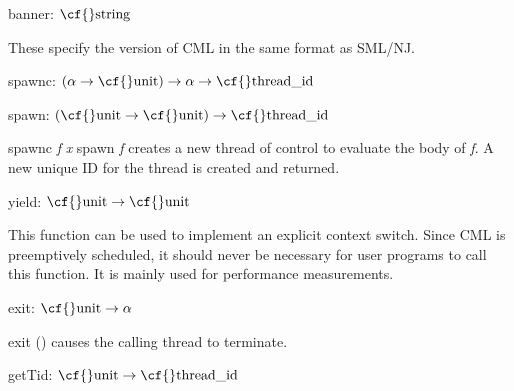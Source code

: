 \begin{descr}
\item {}{} {\cf banner: \(\mbox{\cf{}string}\)}\label{val-CML.banner}


\begin{speccomment}
\item 

	These specify the version of CML in the same format as SML/NJ.     \end{speccomment}
\item {}{} {\cf spawnc: \((\alpha\rightarrow \mbox{\cf{}unit})\rightarrow \alpha\rightarrow \mbox{\cf{}thread\_id}\)}\label{val-CML.spawnc}

\item {}{} {\cf spawn: \((\mbox{\cf{}unit}\rightarrow \mbox{\cf{}unit})\rightarrow \mbox{\cf{}thread\_id}\)}\label{val-CML.spawn}


\begin{speccomment}
\item {\cf \small spawnc \mbox{\cf \small \textit{f}} \mbox{\cf \small \textit{x}} 	\newline}
{\cf \small           spawn \mbox{\cf \small \textit{f}}         } 
creates a new thread of control to evaluate the body of \mbox{\cf \small \textit{f}}. 	A new unique ID for the thread is created and returned.     \end{speccomment}
\item {}{} {\cf yield: \(\mbox{\cf{}unit}\rightarrow \mbox{\cf{}unit}\)}\label{val-CML.yield}


\begin{speccomment}
\item 

	This function can be used to implement an explicit context switch. 	Since CML is preemptively scheduled, it should never be necessary for 	user programs to call this function. 	It is mainly used for performance measurements.     \end{speccomment}
\item {}{} {\cf exit: \(\mbox{\cf{}unit}\rightarrow \alpha\)}\label{val-CML.exit}


\begin{speccomment}
\item {\cf \small exit () 	} 
causes the calling thread to terminate.     \end{speccomment}
\item {}{} {\cf getTid: \(\mbox{\cf{}unit}\rightarrow \mbox{\cf{}thread\_id}\)}\label{val-CML.getTid}



\end{descr}
